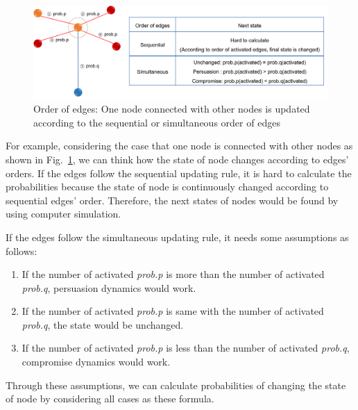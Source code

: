 \begin{figure}[!htb]
	\centering
	\includegraphics[width=\hsize]{figure/chap4_edgeorder_explanation.png}
	\caption{Order of edges: One node connected with other nodes is updated according to the sequential or simultaneous order of edges}
	\label{edgeorder_explanation}
\end{figure}  

For example, considering the case that one node is connected with other nodes as shown in Fig.~\ref{edgeorder_explanation}, we can think how the state of node changes according to edges' orders. If the edges follow the sequential updating rule, it is hard to calculate the probabilities because the state of node is continuously changed according to sequential edges' order. Therefore, the next states of nodes would be found by using computer simulation.

If the edges follow the simultaneous updating rule, it needs some assumptions as follows: 
\begin{enumerate}
	\item If the number of activated \textit{prob.p} is more than the number of activated \textit{prob.q}, persuasion dynamics would work. 
	\item If the number of activated \textit{prob.p} is same with the number of activated \textit{prob.q}, the state would be unchanged.
	\item If the number of activated \textit{prob.p} is less than the number of activated \textit{prob.q}, compromise dynamics would work.
\end{enumerate}

Through these assumptions, we can calculate probabilities of changing the state of node by considering all cases as these formula.  

